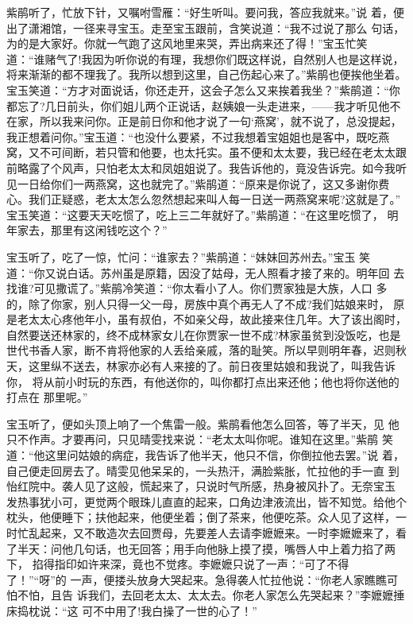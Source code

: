 紫鹃听了，忙放下针，又嘱咐雪雁：“好生听叫。要问我，答应我就来。”说
着，便出了潇湘馆，一径来寻宝玉。走至宝玉跟前，含笑说道：“我不过说了那么
句话，为的是大家好。你就一气跑了这风地里来哭，弄出病来还了得！”宝玉忙笑
道：“谁赌气了!我因为听你说的有理，我想你们既这样说，自然别人也是这样说，
将来渐渐的都不理我了。我所以想到这里，自己伤起心来了。”紫鹃也便挨他坐着。
宝玉笑道：“方才对面说话，你还走开，这会子怎么又来挨着我坐？”紫鹃道：“你
都忘了?几日前头，你们姐儿两个正说话，赵姨娘一头走进来，——我才听见他不
在家，所以我来问你。正是前日你和他才说了一句‘燕窝’，就不说了，总没提起，
我正想着问你。”宝玉道：“也没什么要紧，不过我想着宝姐姐也是客中，既吃燕
窝，又不可间断，若只管和他要，也太托实。虽不便和太太要，我已经在老太太跟
前略露了个风声，只怕老太太和凤姐姐说了。我告诉他的，竟没告诉完。如今我听
见一日给你们一两燕窝，这也就完了。”紫鹃道：“原来是你说了，这又多谢你费
心。我们正疑惑，老太太怎么忽然想起来叫人每一日送一两燕窝来呢?这就是了。”
宝玉笑道：“这要天天吃惯了，吃上三二年就好了。”紫鹃道：“在这里吃惯了，
明年家去，那里有这闲钱吃这个？”

宝玉听了，吃了一惊，忙问：“谁家去？”紫鹃道：“妹妹回苏州去。”宝玉
笑道：“你又说白话。苏州虽是原籍，因没了姑母，无人照看才接了来的。明年回
去找谁?可见撒谎了。”紫鹃冷笑道：“你太看小了人。你们贾家独是大族，人口
多的，除了你家，别人只得一父一母，房族中真个再无人了不成?我们姑娘来时，
原是老太太心疼他年小，虽有叔伯，不如亲父母，故此接来住几年。大了该出阁时，
自然要送还林家的，终不成林家女儿在你贾家一世不成?林家虽贫到没饭吃，也是
世代书香人家，断不肯将他家的人丢给亲戚，落的耻笑。所以早则明年春，迟则秋
天，这里纵不送去，林家亦必有人来接的了。前日夜里姑娘和我说了，叫我告诉你，
将从前小时玩的东西，有他送你的，叫你都打点出来还他；他也将你送他的打点在
那里呢。”

宝玉听了，便如头顶上响了一个焦雷一般。紫鹃看他怎么回答，等了半天，见
他只不作声。才要再问，只见晴雯找来说：“老太太叫你呢。谁知在这里。”紫鹃
笑道：“他这里问姑娘的病症，我告诉了他半天，他只不信，你倒拉他去罢。”说
着，自己便走回房去了。晴雯见他呆呆的，一头热汗，满脸紫胀，忙拉他的手一直
到怡红院中。袭人见了这般，慌起来了，只说时气所感，热身被风扑了。无奈宝玉
发热事犹小可，更觉两个眼珠儿直直的起来，口角边津液流出，皆不知觉。给他个
枕头，他便睡下；扶他起来，他便坐着；倒了茶来，他便吃茶。众人见了这样，一
时忙乱起来，又不敢造次去回贾母，先要差人去请李嬷嬷来。一时李嬷嬷来了，看
了半天：问他几句话，也无回答；用手向他脉上摸了摸，嘴唇人中上着力掐了两下，
掐得指印如许来深，竟也不觉疼。李嬷嬷只说了一声：“可了不得了！”“呀”的
一声，便搂头放身大哭起来。急得袭人忙拉他说：“你老人家瞧瞧可怕不怕，且告
诉我们，去回老太太、太太去。你老人家怎么先哭起来？”李嬷嬷捶床捣枕说：“这
可不中用了!我白操了一世的心了！”

